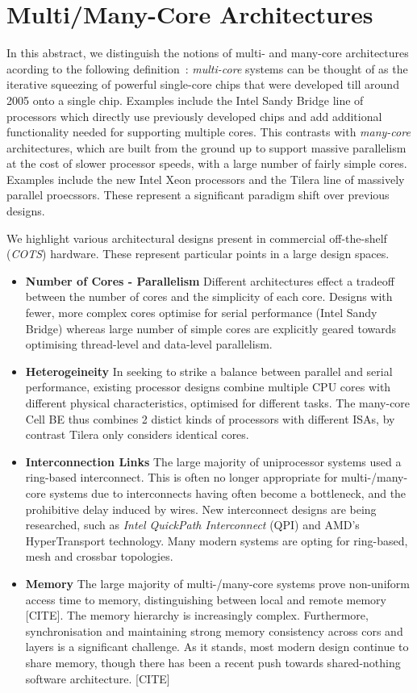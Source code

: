 \section{Multi/Many-Core Architectures}
\label{sec:overview}
In this abstract, we distinguish the notions of multi- and many-core
architectures acording to the following definition~\cite{Re:12}:
\emph{multi-core} systems can be thought of as the iterative squeezing of powerful
 single-core chips that
were developed till around 2005 onto a single chip. Examples include the
 Intel Sandy Bridge line of processors which directly use previously developed chips
and add additional functionality needed for supporting multiple cores. This
contrasts with \emph{many-core} architectures, which are built from the ground up 
to support massive parallelism at the cost of slower processor speeds,
with a large number of fairly simple cores.  Examples include
the new Intel Xeon processors and the Tilera line of massively parallel proecssors.
These represent a significant paradigm shift over previous designs.

We highlight various architectural designs present in commercial off-the-shelf
(\emph{COTS}) hardware. These represent particular points in a large design
spaces.
\begin{itemize}
\item {\bf Number of Cores - Parallelism} Different architectures effect a tradeoff between the
number of cores and the simplicity of each core. Designs with fewer,
more complex cores optimise for serial performance (Intel Sandy Bridge)
whereas large number of simple cores are explicitly geared towards
optimising thread-level and data-level parallelism.
\item {\bf Heterogeineity} In seeking to strike a balance between parallel and
serial performance, existing processor designs combine multiple CPU cores with
different physical characteristics, optimised for different tasks. The many-core
Cell BE thus combines 2 distict kinds of processors with different ISAs, by
contrast Tilera only considers identical cores.
\item {\bf Interconnection Links} The large majority of uniprocessor systems
used a ring-based interconnect. This is often no longer appropriate for
multi-/many-core systems due to interconnects having often become a bottleneck,
and the prohibitive delay induced by wires. New interconnect designs are being researched,
such as \emph{Intel QuickPath Interconnect} (QPI) and  AMD's HyperTransport technology.
Many modern systems are opting for ring-based, mesh and crossbar topologies.
\item {\bf Memory} The large majority of multi-/many-core systems prove
non-uniform access time to memory, distinguishing between local and remote
memory [CITE]. The memory hierarchy is increasingly complex.
Furthermore, synchronisation and maintaining strong memory consistency across
cors and layers is a significant challenge. As it stands, most modern
design continue to share memory, though there has been a recent push
towards shared-nothing software architecture. [CITE]
\end{itemize}
